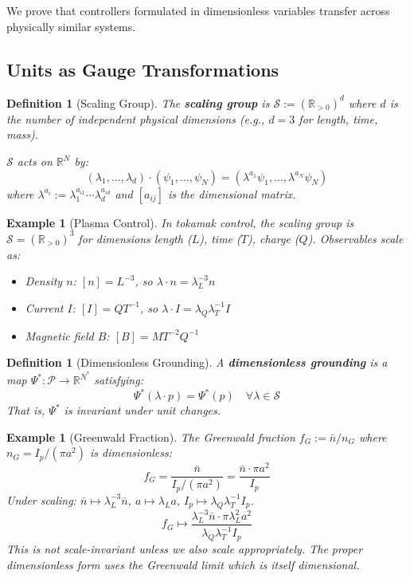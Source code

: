 \documentclass[11pt]{article}
\newtheorem{definition}[theorem]{Definition}
\newtheorem{example}[theorem]{Example}
\begin{document}
We prove that controllers formulated in dimensionless variables transfer across physically similar
systems.

\subsection{Units as Gauge Transformations}

\begin{definition}[Scaling Group]
The \textbf{scaling group} is $\mathcal{S} := (\mathbb{R}_{>0})^d$ where $d$ is the number of
independent physical dimensions (e.g., $d = 3$ for length, time, mass).

$\mathcal{S}$ acts on $\mathbb{R}^N$ by:
\[
(\lambda_1, \ldots, \lambda_d) \cdot (\psi_1, \ldots, \psi_N) = (\lambda^{a_1}\psi_1, \ldots, \lambda^{a_N}\psi_N)
\]
where $\lambda^{a_i} := \lambda_1^{a_{i1}} \cdots \lambda_d^{a_{id}}$ and $[a_{ij}]$ is the dimensional matrix.
\end{definition}

\begin{example}[Plasma Control]
In tokamak control, the scaling group is $\mathcal{S} = (\mathbb{R}_{>0})^3$ for
dimensions length ($L$), time ($T$), charge ($Q$). Observables scale as:
\begin{itemize}
    \item Density $n$: $[n] = L^{-3}$, so $\lambda \cdot n = \lambda_L^{-3} n$
    \item Current $I$: $[I] = QT^{-1}$, so $\lambda \cdot I = \lambda_Q \lambda_T^{-1} I$
    \item Magnetic field $B$: $[B] = MT^{-2}Q^{-1}$
\end{itemize}
\end{example}

\begin{definition}[Dimensionless Grounding]
A \textbf{dimensionless grounding} is a map $\Psi^* : \mathcal{P} \to
\mathbb{R}^{N^*}$ satisfying:
\[
\Psi^*(\lambda \cdot p) = \Psi^*(p) \quad \forall \lambda \in \mathcal{S}
\]
That is, $\Psi^*$ is invariant under unit changes.
\end{definition}

\begin{example}[Greenwald Fraction]
The Greenwald fraction $f_G := \bar{n}/n_G$ where $n_G = I_p/(\pi a^2)$
is dimensionless:
\[
f_G = \frac{\bar{n}}{I_p/(\pi a^2)} = \frac{\bar{n} \cdot \pi a^2}{I_p}
\]
Under scaling: $\bar{n} \mapsto \lambda_L^{-3}\bar{n}$, $a \mapsto \lambda_L a$, $I_p \mapsto \lambda_Q\lambda_T^{-1}I_p$.
\[
f_G \mapsto \frac{\lambda_L^{-3}\bar{n} \cdot \pi\lambda_L^2 a^2}{\lambda_Q\lambda_T^{-1}I_p}
\]
This is not scale-invariant unless we also scale appropriately. The proper dimensionless form
uses the Greenwald limit which is itself dimensional.
\end{example}
\end{document}
